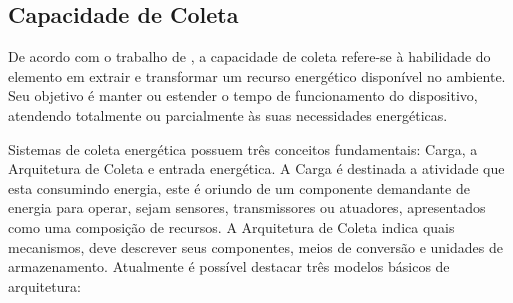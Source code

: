 





\subsection{Capacidade de Coleta}\label{Capacidade de Coleta}
De acordo com o trabalho de \cite{sudevalayam_energy_2011}, a capacidade de coleta refere-se à habilidade do elemento em extrair e transformar um recurso energético disponível no ambiente. Seu objetivo é manter ou estender o tempo de funcionamento do dispositivo, atendendo totalmente ou parcialmente às suas necessidades energéticas.

Sistemas de coleta energética possuem três conceitos fundamentais: Carga, a Arquitetura de Coleta e entrada energética. A Carga é destinada a atividade que esta consumindo energia, este é oriundo de um componente demandante de energia para operar, sejam sensores, transmissores ou  atuadores, apresentados como uma composição de recursos. A Arquitetura de Coleta indica quais mecanismos, deve descrever seus componentes, meios de conversão e unidades de armazenamento. Atualmente é possível destacar três modelos básicos de arquitetura:

